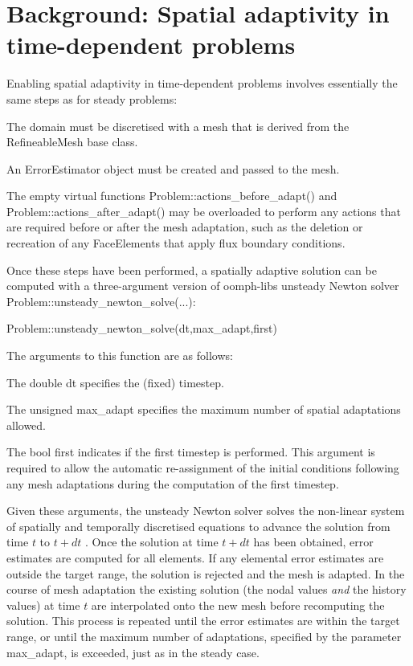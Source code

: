  

\hypertarget{index_spatial_adapt}{}\section{Background\+: Spatial adaptivity in time-\/dependent problems}\label{index_spatial_adapt}
Enabling spatial adaptivity in time-\/dependent problems involves essentially the same steps as for steady problems\+:
\begin{DoxyItemize}
\item The domain must be discretised with a mesh that is derived from the {\ttfamily Refineable\+Mesh} base class.
\item An {\ttfamily Error\+Estimator} object must be created and passed to the mesh.
\item The empty virtual functions {\ttfamily Problem\+::actions\+\_\+before\+\_\+adapt()} and {\ttfamily Problem\+::actions\+\_\+after\+\_\+adapt()} may be overloaded to perform any actions that are required before or after the mesh adaptation, such as the deletion or recreation of any {\ttfamily Face\+Elements} that apply flux boundary conditions.
\end{DoxyItemize}Once these steps have been performed, a spatially adaptive solution can be computed with a three-\/argument version of {\ttfamily oomph-\/lib\textquotesingle{}s} unsteady Newton solver {\ttfamily Problem\+::unsteady\+\_\+newton\+\_\+solve}(...)\+:


\begin{DoxyCode}
Problem::unsteady\_newton\_solve(dt,max\_adapt,first)
\end{DoxyCode}


The arguments to this function are as follows\+:
\begin{DoxyItemize}
\item The {\ttfamily double} {\ttfamily dt} specifies the (fixed) timestep.
\item The {\ttfamily unsigned} {\ttfamily max\+\_\+adapt} specifies the maximum number of spatial adaptations allowed.
\item The {\ttfamily bool} {\ttfamily first} indicates if the first timestep is performed. This argument is required to allow the automatic re-\/assignment of the initial conditions following any mesh adaptations during the computation of the first timestep.
\end{DoxyItemize}Given these arguments, the unsteady Newton solver solves the non-\/linear system of spatially and temporally discretised equations to advance the solution from time $ t $ to $ t + dt $ . Once the solution at time $ t + dt $ has been obtained, error estimates are computed for all elements. If any elemental error estimates are outside the target range, the solution is rejected and the mesh is adapted. In the course of mesh adaptation the existing solution (the nodal values {\itshape and} the history values) at time $ t $ are interpolated onto the new mesh before recomputing the solution. This process is repeated until the error estimates are within the target range, or until the maximum number of adaptations, specified by the parameter {\ttfamily max\+\_\+adapt}, is exceeded, just as in the steady case.


